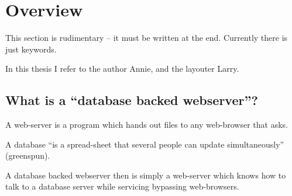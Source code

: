 
\chapter{Overview}

\textsf{This section is rudimentary -- it must be written at the end.
  Currently there is just keywords.}

\textsf{In this thesis I refer to the author Annie, and the layouter
  Larry.}

\section{What is a ``database backed webserver''?}

A web-server is a program which hands out files to any web-browser
that asks.

A database ``is a spread-sheet that several people can update
simultaneously'' (\textsf{greenspun}).

A database backed webserver then is simply a web-server which knows how
to talk to a database server while servicing bypassing web-browsers.






